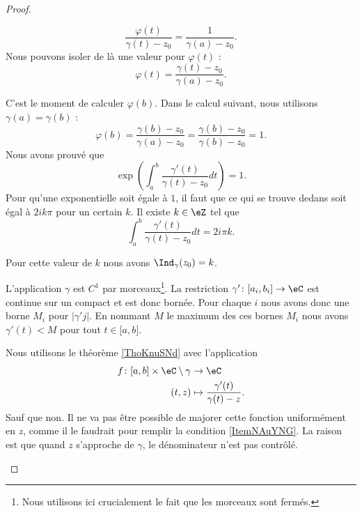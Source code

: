 \begin{proof}
\begin{subproof}
		\begin{equation}
			\frac{ \varphi(t) }{ \gamma(t)-z_0 }=\frac{ 1 }{ \gamma(a)-z_0 }.
		\end{equation}
		Nous pouvons isoler de là une valeur pour \( \varphi(t)\) :
		\begin{equation}
			\varphi(t)=\frac{ \gamma(t)-z_0 }{ \gamma(a)-z_0 }.
		\end{equation}

		C'est le moment de calculer \( \varphi(b)\). Dans le calcul suivant, nous utilisons \( \gamma(a)=\gamma(b)\) :
		\begin{equation}
			\varphi(b)=\frac{ \gamma(b)-z_0 }{ \gamma(a)-z_0 }=\frac{ \gamma(b)-z_0 }{ \gamma(b)-z_0 }=1.
		\end{equation}
		Nous avons prouvé que
		\begin{equation}
			\exp\left( \int_a^b\frac{ \gamma'(t) }{ \gamma(t)-z_0 }dt \right)=1.
		\end{equation}
		Pour qu'une exponentielle soit égale à \( 1\), il faut que ce qui se trouve dedans soit égal à \( 2ik\pi\) pour un certain \( k\). Il existe \( k\in \eZ\) tel que
		\begin{equation}
			\int_a^b\frac{ \gamma'(t) }{ \gamma(t)-z_0 }dt=2i\pi k.
		\end{equation}

		Pour cette valeur de \( k\) nous avons \( \Ind_{\gamma}(z_0)=k\).

		L'application \( \gamma\) est \( C^1\) par morceaux\footnote{Nous utilisons ici crucialement le fait que les morceaux sont fermés.}. La restriction \(\gamma' \colon \mathopen[ a_i,b_i\mathclose]\to \eC  \) est continue sur un compact et est donc bornée. Pour chaque \( i\) nous avons donc une borne \( M_i\) pour \( | \gamma'j |\). En nommant \( M\) le maximum des ces bornes \( M_i\) nous avons \( \gamma'(t)<M\) pour tout \( t\in \mathopen[ a,b\mathclose]\).

		Nous utilisons le théorème \ref{ThoKnuSNd} avec l'application
		\begin{equation}
			\begin{aligned}
				f\colon \mathopen[ a,b\mathclose]\times \eC\setminus\gamma & \to \eC                                     \\
				(t,z)                                                      & \mapsto \frac{ \gamma'(t) }{ \gamma(t)-z }.
			\end{aligned}
		\end{equation}
		Sauf que non. Il ne va pas être possible de majorer cette fonction uniformément en \( z\), comme il le faudrait pour remplir la condition \ref{ItemNAuYNG}. La raison est que quand \( z\) s'approche de \( \gamma\), le dénominateur n'est pas contrôlé.


\end{subproof}
\end{proof}
